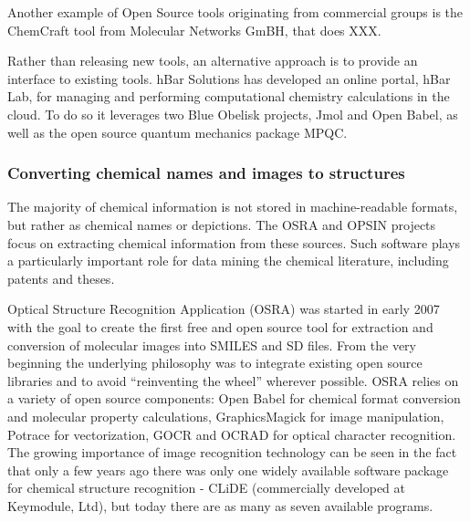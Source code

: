 \documentclass[10pt]{bmc_article}
\newenvironment{bmcformat}{\begin{raggedright}\baselineskip20pt\sloppy\setboolean{publ}{false}}{\end{raggedright}\baselineskip20pt\sloppy}
\begin{document}
\begin{bmcformat}
Another example of Open Source
tools originating from commercial groups is the ChemCraft tool from
Molecular Networks GmBH, that does XXX.

Rather than releasing new tools, an alternative approach is to provide an
interface to existing tools. hBar Solutions has developed an online
portal, hBar Lab, for managing and performing computational chemistry
calculations in the cloud. To do so it leverages two Blue Obelisk
projects, Jmol and Open Babel, as well as the open source quantum
mechanics package MPQC.

\subsubsection*{Converting chemical names and images to structures}

The majority of chemical information is not stored in machine-readable
formats, but rather as chemical names or depictions. The OSRA and OPSIN
projects focus on extracting chemical information from these sources.
Such software plays a particularly important role for data mining the
chemical literature, including patents and theses.

Optical Structure Recognition Application (OSRA) \cite{WebOSRA} was started
in early 2007 with the goal to create the first free and open source
tool for extraction and conversion of molecular images into SMILES and
SD files. From the very beginning the underlying philosophy was to integrate
existing open source libraries and to avoid ``reinventing the wheel''
wherever possible. OSRA relies on a variety of open source components:
Open Babel for chemical format
conversion and molecular property calculations, GraphicsMagick for image
manipulation, Potrace for vectorization, GOCR and OCRAD for optical
character recognition. The growing importance of image
recognition technology can be seen in the fact that
only a few years ago there was only one widely available software
package for chemical structure recognition -  CLiDE (commercially
developed at Keymodule, Ltd), but today there are as many as seven
available programs.


\end{bmcformat}
\end{document}
